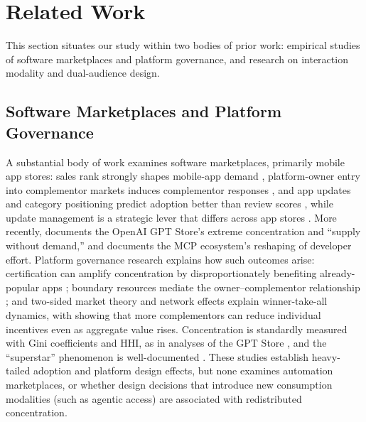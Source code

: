 \section{Related Work}
\label{sec:background}

This section situates our study within two bodies of prior work: empirical
studies of software marketplaces and platform governance, and research on
interaction modality and dual-audience design.

\subsection{Software Marketplaces and Platform Governance}
\label{sec:rw:marketplace}

A substantial body of work examines software marketplaces, primarily mobile app
stores: sales rank strongly shapes mobile-app demand
\cite{ghose2014apppricing}, platform-owner entry into complementor markets
induces complementor responses
\cite{wen2019platformowner}, and app updates and category positioning predict
adoption better than review scores \cite{janssen2022googleplay}, while update
management is a strategic lever that differs across app stores
\cite{comino2019appstore}. More recently,
\citet{su2024gptstore} documents the OpenAI GPT Store's extreme concentration
and ``supply without demand,'' and \citet{stein2026mcpecosystem} documents the
MCP ecosystem's reshaping of developer effort. Platform governance research
\cite{rietveld2021platform} explains how such outcomes arise: certification can
amplify concentration by disproportionately benefiting already-popular apps
\cite{rietveld2021marketorchestrators};
boundary resources mediate the owner--complementor relationship
\cite{eaton2015governance,tiwana2015platformecosystems}; and two-sided market
theory \cite{rochet2003twosided} and network effects \cite{caillaud2003chicken}
explain winner-take-all dynamics, with \citet{boudreau2012complementors} showing
that more complementors can reduce individual incentives even as aggregate
value rises. Concentration is standardly measured with Gini coefficients and
HHI, as in analyses of the GPT Store \cite{su2024gptstore}, and the
``superstar'' phenomenon is well-documented
\cite{aguiar2018platforms}. These studies establish heavy-tailed adoption and
platform design effects, but none examines automation marketplaces, or whether
design decisions that introduce new consumption modalities (such as agentic
access) are associated with redistributed concentration.


